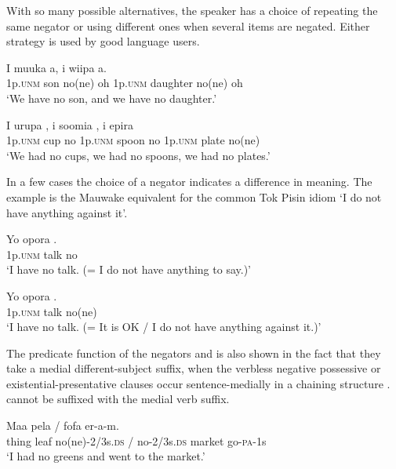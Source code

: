 With so many possible alternatives, the speaker has a choice of repeating the same negator  or using different ones  when several items are negated. Either strategy is used by good language users.

\ea%
\label{ex:6:x1128}
\gll I  muuka    a,  i  wiipa    a. \\
1p.\textsc{unm}  son  no(ne)  oh  1p.\textsc{unm}  daughter  no(ne)  oh\\
\glt `We have no son, and we have no daughter.'
\z

\ea%
\label{ex:6:x1127}
\gll I  urupa  ,  i  soomia  ,  i epira  \\
1p.\textsc{unm}  cup  no  1p.\textsc{unm}  spoon  no  1p.\textsc{unm} plate  no(ne)\\
\glt `We had no cups, we had no spoons, we had no plates.'
\z

In a few cases the choice of a negator indicates a difference in meaning. The example  is the Mauwake equivalent for the common Tok Pisin idiom  `I do not have anything against it'.

\ea%
\label{ex:6:x1129}
\gll Yo  opora  . \\
1p.\textsc{unm}  talk  no\\
\glt `I have no talk. (= I do not have anything to say.)'
\z

\ea%
\label{ex:6:x1130}
\gll Yo  opora  . \\
1p.\textsc{unm}  talk  no(ne)\\
\glt `I have no talk. (= It is OK / I do not have anything against it.)'
\z

The predicate function of the negators  and  is also shown in the fact that they take a medial different-subject suffix, when the verbless negative possessive or existential-presentative clauses occur sentence-medially in a chaining structure .  cannot be suffixed with the medial verb suffix.

\ea%
\label{ex:6:x1101}
\gll Maa  pela    /    fofa  er-a-m. \\
thing  leaf  no(ne)-2/3s.\textsc{ds}  /  no-2/3s.\textsc{ds}  market  go-\textsc{pa}-1s\\
\glt `I had no greens and went to the market.'
\z

